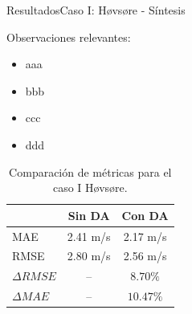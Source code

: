 \documentclass[mathserif,10pt]{beamer}
\begin{document}
\begin{frame}{Resultados}{Caso I: Høvsøre - Síntesis}
	\begin{minipage}{0.5\linewidth}
		Observaciones relevantes:
		\begin{itemize}
			\item aaa
			\item bbb
			\item ccc
			\item ddd
		\end{itemize}
	\end{minipage}%
	\begin{minipage}{0.5\linewidth}
		\begin{table}[H]
			\caption{Comparación de métricas para el caso I Høvsøre.}
			\label{tab:06_hov_mae_rmse}
			\centering%
			\begin{tabular}{lcc}
				\toprule
				& Sin DA & Con DA \\
				\midrule
				MAE & 2.41 m/s & 2.17 m/s \\
				RMSE & 2.80 m/s& 2.56 m/s\\
				$\Delta{RMSE}$& --  & $8.70\%$  \\
				$\Delta{MAE}$ & -- & $10.47\%$  \\
				\bottomrule
			\end{tabular}
		\end{table}
	\end{minipage}%
\end{frame}
\end{document}
